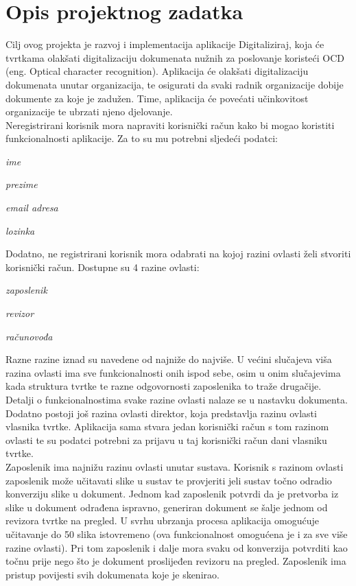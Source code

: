 \chapter{Opis projektnog zadatka}
		
		
		Cilj ovog projekta je razvoj i implementacija aplikacije Digitaliziraj, koja će tvrtkama olakšati digitalizaciju dokumenata nužnih za poslovanje koristeći OCD (eng. Optical character recognition). Aplikacija će olakšati digitalizaciju dokumenata unutar organizacija, te osigurati da svaki radnik organizacije dobije dokumente za koje je zadužen. Time, aplikacija će povećati učinkovitost organizacije te ubrzati njeno djelovanje.\\
		
		Neregistrirani korisnik mora napraviti korisnički račun kako bi mogao koristiti funkcionalnosti aplikacije. Za to su mu potrebni sljedeći podatci:
		
		\begin{packed_item}
			\item \textit{ime}
			\item \textit{prezime}
			\item \textit{email adresa}
			\item \textit{lozinka}
		\end{packed_item}
	
	Dodatno, ne registrirani korisnik mora odabrati na kojoj razini ovlasti želi stvoriti korisnički račun. Dostupne su 4 razine ovlasti:
	
	\begin{packed_item}
		\item \textit{zaposlenik}
		\item \textit{revizor}
		\item \textit{računovođa}
	\end{packed_item}
	
	Razne razine iznad su navedene od najniže do najviše. U većini slučajeva viša razina ovlasti ima sve funkcionalnosti onih ispod sebe, osim u onim slučajevima kada struktura tvrtke te razne odgovornosti zaposlenika to traže drugačije. Detalji o funkcionalnostima svake razine ovlasti nalaze se u nastavku dokumenta. Dodatno postoji još razina ovlasti direktor, koja predstavlja razinu ovlasti vlasnika tvrtke. Aplikacija sama stvara jedan korisnički račun s tom razinom ovlasti te su podatci potrebni za prijavu u taj korisnički račun dani vlasniku tvrtke.\\
	
	Zaposlenik ima najnižu razinu ovlasti unutar sustava. Korisnik s razinom ovlasti zaposlenik može učitavati slike u sustav te provjeriti jeli sustav točno odradio konverziju slike u dokument. Jednom kad zaposlenik potvrdi da je pretvorba iz slike u dokument odrađena ispravno, generiran dokument se šalje jednom od revizora tvrtke na pregled. U svrhu ubrzanja procesa aplikacija omogućuje učitavanje do 50 slika istovremeno (ova funkcionalnost omogućena je i za sve više razine ovlasti). Pri tom zaposlenik i dalje mora svaku od konverzija potvrditi kao točnu prije nego što je dokument proslijeđen revizoru na pregled. Zaposlenik ima pristup povijesti svih dokumenata koje je skenirao.\\
	
